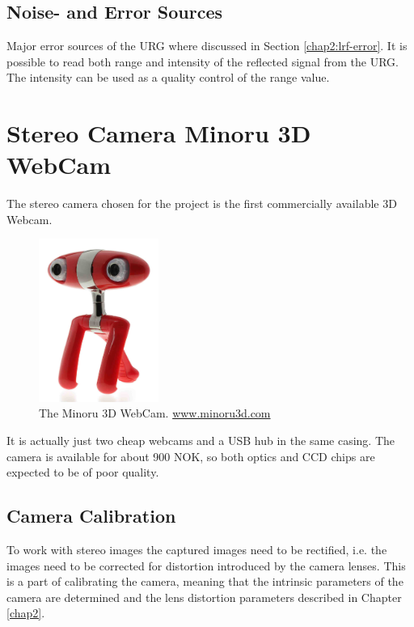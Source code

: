 \subsection{Noise- and Error Sources}
Major error sources of the URG where discussed in Section \ref{chap2:lrf-error}. It is
possible to read both range and intensity of the reflected signal from the URG. The
intensity can be used as a quality control of the range value. 





\section{Stereo Camera Minoru 3D WebCam}
The stereo camera chosen for the project is the first commercially available 3D Webcam.
\begin{figure}[htbp]
    \centering
    \includegraphics[width=0.35\textwidth]{pics/minoru3d}
    \caption{The Minoru 3D WebCam. \url{www.minoru3d.com}}
    \label{chap3:fig-minoru}
\end{figure}
It is actually just two cheap webcams and a USB hub in the same casing. The camera is
available for about 900 NOK, so both optics and CCD chips are expected to be of poor
quality.


\subsection{Camera Calibration}
To work with stereo images the captured images need to be rectified, i.e. the images need
to be corrected for distortion introduced by the camera lenses. This is a part of
calibrating the camera, meaning that the intrinsic parameters of the camera are
determined and the lens distortion parameters described in Chapter \ref{chap2}.

